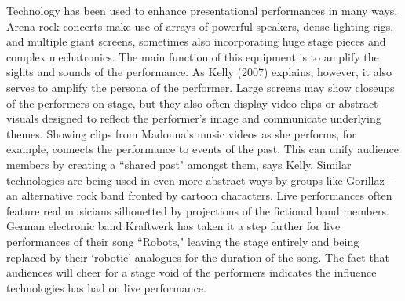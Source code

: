 Technology has been used to enhance presentational performances in many ways. Arena rock concerts make use of arrays of powerful speakers, dense lighting rigs, and multiple giant screens, sometimes also incorporating huge stage pieces and complex mechatronics. The main function of this equipment is to amplify the sights and sounds of the performance. As Kelly (2007) explains, however, it also serves to amplify the persona of the performer. Large screens may show closeups of the performers on stage, but they also often display video clips or abstract visuals designed to reflect the performer's image and communicate underlying themes. Showing clips from Madonna's music videos as she performs, for example, connects the performance to events of the past. This can unify audience members by creating a ``shared past" amongst them, says Kelly. Similar technologies are being used in even more abstract ways by groups like Gorillaz -- an alternative rock band fronted by cartoon characters. Live performances often feature real musicians silhouetted by projections of the fictional band members. German electronic band Kraftwerk has taken it a step farther for live performances of their song ``Robots," leaving the stage entirely and being replaced by their `robotic' analogues for the duration of the song. The fact that audiences will cheer for a stage void of the performers indicates the influence technologies has had on live performance.

